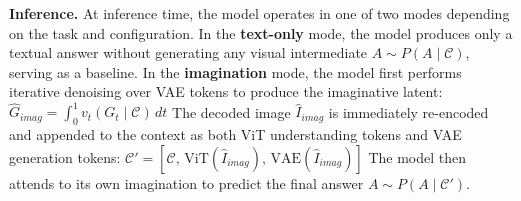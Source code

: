 \documentclass{llmxive}
\begin{document}
\noindent\textbf{Inference.} 
At inference time, the model operates in one of two modes depending on the task and configuration.
In the \textbf{text-only} mode, the model produces only a textual answer without generating any visual intermediate $A \sim P(A \mid \mathcal{C})$, serving as a baseline.
In the \textbf{imagination} mode, the model first performs iterative denoising over VAE tokens to produce the imaginative latent:
$\hat{G}_{imag} = \int_{0}^{1} v_t(G_t \mid \mathcal{C}) \, dt$
The decoded image $\hat{I}_{imag}$ is immediately re-encoded and appended to the context as both ViT understanding tokens and VAE generation tokens:
$\mathcal{C}' = \left[\mathcal{C},\, \text{ViT}(\hat{I}_{imag}),\, \text{VAE}(\hat{I}_{imag})\right]$
The model then attends to its own imagination to predict the final answer $A \sim P(A \mid \mathcal{C}')$.










\end{document}
